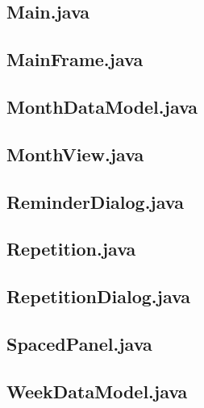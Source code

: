 \documentclass{article}
\begin{document}


\subsection{Main.java}



\subsection{MainFrame.java}



\subsection{MonthDataModel.java}



\subsection{MonthView.java}



\subsection{ReminderDialog.java}



\subsection{Repetition.java}



\subsection{RepetitionDialog.java}



\subsection{SpacedPanel.java}



\subsection{WeekDataModel.java}
\end{document}
